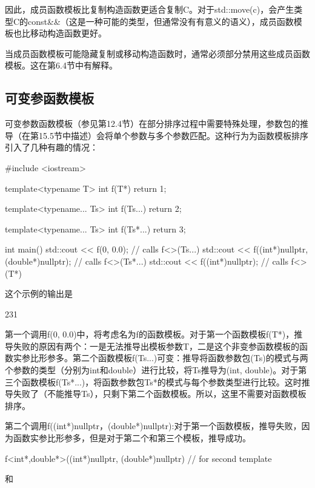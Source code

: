 因此，成员函数模板比复制构造函数更适合复制C。对于std::move(c)，会产生类型C的const\&\&（这是一种可能的类型，但通常没有有意义的语义），成员函数模板也比移动构造函数更好。

当成员函数模板可能隐藏复制或移动构造函数时，通常必须部分禁用这些成员函数模板。这在第6.4节中有解释。

\subsection{可变参函数模板}

可变参数函数模板（参见第12.4节）在部分排序过程中需要特殊处理，参数包的推导（在第15.5节中描述）会将单个参数与多个参数匹配。这种行为为函数模板排序引入了几种有趣的情况：

\begin{cpp}
#include <iostream>

template<typename T>
int f(T*) {
	return 1;
}

template<typename... Ts>
int f(Ts...) {
	return 2;
}

template<typename... Ts>
int f(Ts*...) {
	return 3;
}

int main() {
	std::cout << f(0, 0.0); // calls f<>(Ts...)
	std::cout << f((int*)nullptr, (double*)nullptr); // calls f<>(Ts*...)
	std::cout << f((int*)nullptr); // calls f<>(T*)
}
\end{cpp}

这个示例的输出是

\begin{shell}
231
\end{shell}

第一个调用f(0, 0.0)中，将考虑名为f的函数模板。对于第一个函数模板f(T*)，推导失败的原因有两个：一是无法推导出模板参数T，二是这个非变参函数模板的函数实参比形参多。第二个函数模板f(Ts...)可变：推导将函数参数包(Ts)的模式与两个参数的类型（分别为int和double）进行比较，将Ts推导为(int, double)。对于第三个函数模板f(Ts*...)，将函数参数包Ts*的模式与每个参数类型进行比较。这时推导失败了（不能推导Ts），只剩下第二个函数模板。所以，这里不需要对函数模板排序。

第二个调用f((int*)nullptr，(double*)nullptr):对于第一个函数模板，推导失败，因为函数实参比形参多，但是对于第二个和第三个模板，推导成功。

\begin{cpp}
f<int*,double*>((int*)nullptr, (double*)nullptr) // for second template
\end{cpp}

和

